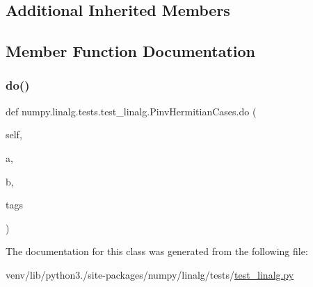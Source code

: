 \subsection*{Additional Inherited Members}


\subsection{Member Function Documentation}
\mbox{\label{classnumpy_1_1linalg_1_1tests_1_1test__linalg_1_1PinvHermitianCases_afb0a02f6c480038c6df8a18af03ef9bd}} 
\subsubsection{\texorpdfstring{do()}{do()}}
{\footnotesize\ttfamily def numpy.\+linalg.\+tests.\+test\+\_\+linalg.\+Pinv\+Hermitian\+Cases.\+do (\begin{DoxyParamCaption}\item[{}]{self,  }\item[{}]{a,  }\item[{}]{b,  }\item[{}]{tags }\end{DoxyParamCaption})}



The documentation for this class was generated from the following file\+:\begin{DoxyCompactItemize}
\item 
venv/lib/python3./site-\/packages/numpy/linalg/tests/\hyperlink{test__linalg_8py}{test\+\_\+linalg.\+py}\end{DoxyCompactItemize}
